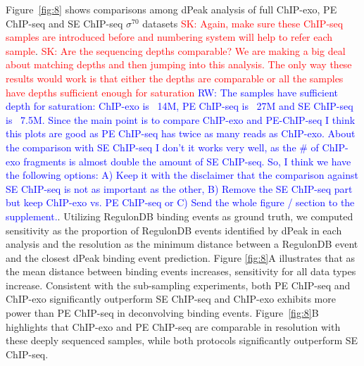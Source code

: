 \documentclass{bmcart}
\newcommand{\SK}[1]{\textcolor{red}{SK: #1}}
\newcommand{\RW}[1]{\textcolor{blue}{RW: #1}}
\newcommand{\sig}{\sigma^{70}}
\begin{document}
Figure~\ref{fig:8} shows comparisons among dPeak analysis of
full ChIP-exo, PE ChIP-seq and SE ChIP-seq $\sig$ datasets \SK{Again,
  make sure these ChIP-seq samples are introduced before and numbering
  system will help to refer each sample}. \SK{Are the sequencing
  depths comparable? We are making a big deal about matching depths
  and then jumping into this analysis. The only way these results
  would work is that either the depths are comparable or all the
  samples have depths sufficient enough for saturation} \RW{The
  samples have sufficient depth for saturation: ChIP-exo is ~14M, PE
  ChIP-seq is ~27M and SE ChIP-seq is ~7.5M. Since the main point is
  to compare ChIP-exo and PE-ChIP-seq I think this plots are good as
  PE ChIP-seq has twice as many reads as ChIP-exo. About the
  comparison with SE ChIP-seq I don't it works very well, as the \# of
  ChIP-exo fragments is almost double the amount of SE ChIP-seq. So, I
  think we have the following options: A) Keep it with the disclaimer
  that the comparison against SE ChIP-seq is not as important as the
  other, B) Remove the SE ChIP-seq part but keep ChIP-exo vs. PE
  ChIP-seq or C) Send the whole figure / section to the
  supplement.}. Utilizing RegulonDB binding events as ground truth,
we computed sensitivity  as the proportion of RegulonDB events 
identified by dPeak in each analysis and the resolution as the minimum
distance between a RegulonDB event and the closest dPeak binding
event prediction. Figure \ref{fig:8}A illustrates that as the mean distance between binding events increases, sensitivity
for all data types increase. Consistent with the sub-sampling experiments, both PE ChIP-seq and ChIP-exo significantly outperform SE ChIP-seq and ChIP-exo exhibits more power than PE ChIP-seq in deconvolving binding events.
Figure~\ref{fig:8}B highlights that 
ChIP-exo and PE ChIP-seq are comparable in resolution with these deeply sequenced samples, while both
protocols significantly outperform SE ChIP-seq.
\end{document}
